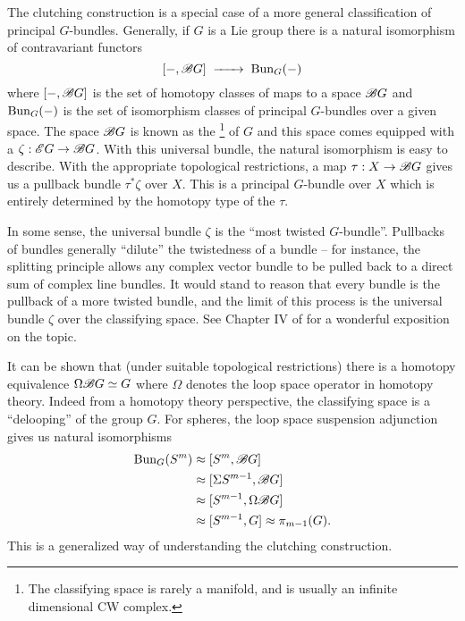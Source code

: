 \begin{remark}
The clutching construction is a special case of a more general classification of principal $G$-bundles. Generally, if $G$ is a Lie group there is a natural isomorphism of contravariant functors
\[
	[-, \Bclass G] \lkxto \Bun_G(-)
\]
where $[-, \mathscr{B} G]$ is the set of homotopy classes of maps to a space $\mathscr{B} G$ and $\operatorname{Bun}_G(-)$ is the set of isomorphism classes of principal $G$-bundles over a given space.
The space $\mathscr{B} G$ is known as the \footnote{The classifying space is rarely a manifold, and is usually an infinite dimensional CW complex.} of $G$ and this space comes equipped with a  $\zeta : \mathscr{E} G \to \mathscr{B} G$. With this universal bundle, the natural isomorphism is easy to describe. With the appropriate topological restrictions, a map $\tau : X \to \mathscr{B} G$ gives us a pullback bundle $\tau^*\zeta$ over $X$. This is a principal $G$-bundle over $X$ which is entirely determined by the homotopy type of the  $\tau$.

In some sense, the universal bundle $\zeta$ is the ``most twisted $G$-bundle''. Pullbacks of bundles generally ``dilute'' the twistedness of a bundle -- for instance, the splitting principle allows any complex vector bundle to be pulled back to a direct sum of complex line bundles. It would stand to reason that every bundle is the pullback of a more twisted bundle, and the limit of this process is the universal bundle $\zeta$ over the classifying space. See Chapter IV of \cite{botttu1982differential} for a wonderful exposition on the topic.

It can be shown that (under suitable topological restrictions) there is a homotopy equivalence $\Omega \mathscr{B} G \simeq G$ where $\Omega$ denotes the loop space operator in homotopy theory. Indeed from a homotopy theory perspective, the classifying space is a ``delooping'' of the group $G$. For spheres, the loop space suspension adjunction gives us natural isomorphisms 
\[
\begin{aligned}
	\operatorname{Bun}_{G}(S^m) &\approx [S^m, \mathscr{B} G] \\
								&\approx [\Sigma S^{m-1}, \mathscr{B} G]\\
								&\approx [S^{m-1}, \Omega\mathscr{B} G]\\
								&\approx [S^{m-1}, G]
								\approx \pi_{m-1}(G).
\end{aligned}
\]
This is a generalized way of understanding the clutching construction.
\end{remark}

